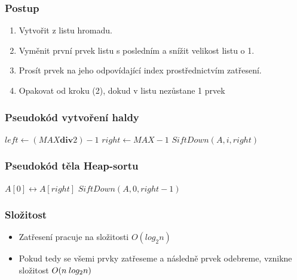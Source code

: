 \documentclass{beamer}
\begin{document}
\begin{frame}
\frametitle{Postup}

\begin{enumerate}
\setlength\itemsep{0.3em}
 \item Vytvořit z listu hromadu.
 \item Vyměnit první prvek listu s posledním a snížit velikost listu o 1.
 \item Prosít prvek na jeho odpovídající index prostřednictvím zatřesení.
 \item Opakovat od kroku (2), dokud v listu nezůstane 1 prvek
\end{enumerate}

\end{frame}



\begin{frame}
\frametitle{Pseudokód vytvoření haldy}

\begin{algorithmic}
\State $left \gets (MAX \textbf{div} 2)-1$
\State $right \gets MAX - 1$
    \State $SiftDown(A,i,right)$
    
\EndFor 
\end{algorithmic}

\end{frame}



\begin{frame}
\frametitle{Pseudokód těla Heap-sortu}

\begin{algorithmic}
    \State $A[0] \leftrightarrow A[right]$
    \State $SiftDown(A,0,right-1)$
\EndFor 

\end{algorithmic}

\end{frame}



\begin{frame}
\frametitle{Složitost}
\begin{itemize}
\setlength\itemsep{0.5em}
 \item Zatřesení pracuje na složitosti $O(log_2n)$
 \item Pokud tedy se všemi prvky zatřeseme a následně prvek odebreme, vznikne složitost $O(n \hspace{0.25em} log_2n)$
\end{itemize}
\end{frame}
\end{document}
